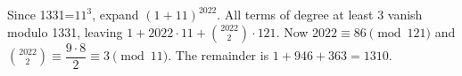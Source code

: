 Since 1331=$11^3$, expand $(1+11)^{2022}$. All terms of degree at least 3 vanish modulo 1331, leaving $1+2022\cdot11+\binom{2022}2\cdot121$. Now $2022\equiv86\pmod{121}$ and $\binom{2022}2\equiv\dfrac{9\cdot8}{2}\equiv3\pmod{11}$. The remainder is $1+946+363=\boxed{1310}$.
